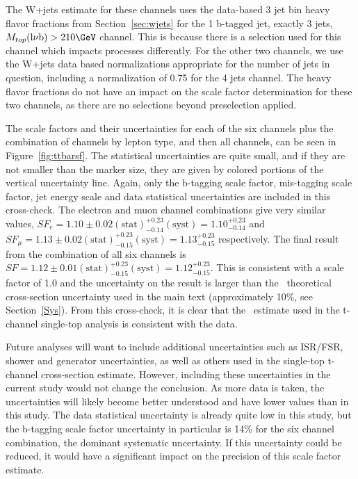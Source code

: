 The W+jets estimate for these channels uses the data-based 3 jet bin heavy flavor fractions from Section~\ref{sec:wjets} for the 1 b-tagged jet, exactly 3  jets, $M_{top}(\rm l\nu b)>210\GeV$ channel.  This is because there is a selection used for this channel which impacts processes differently.  For the other two channels, we use the W+jets data based normalizations appropriate for the number of jets in question, including a normalization of 0.75 for the 4 jets channel.  The heavy flavor fractions do not have an impact on the scale factor determination for these two channels, as there are no selections beyond preselection applied.

The scale factors and their uncertainties for each of the six channels plus the combination of channels by lepton type, and then all channels, can be seen in Figure~\ref{fig:ttbarsf}.  The statistical uncertainties are quite small, and if they are not smaller than the marker size, they are given by colored portions of the vertical uncertainty line.  Again, only the b-tagging scale factor, mis-tagging scale factor, jet energy scale and data statistical uncertainties are included in this cross-check.  The electron and muon channel combinations give very similar values, $SF_{e} = 1.10\pm0.02 \mathrm{(stat)} ^{+0.23}_{-0.14} \mathrm{(syst)} = 1.10^{+0.23}_{-0.14}$ and $SF_{\mu} = 1.13\pm0.02 \mathrm{(stat)} ^{+0.23}_{-0.15} \mathrm{(syst)} = 1.13^{+0.23}_{-0.15}$ respectively.  The final result from the combination of all six channels is $SF = 1.12\pm0.01 \mathrm{(stat)} ^{+0.23}_{-0.15} \mathrm{(syst)} = 1.12^{+0.23}_{-0.15}$.  This is consistent with a scale factor of 1.0 and the uncertainty on the result is larger than the \ttbar~theoretical cross-section uncertainty used in the main text (approximately 10\%, see Section~\ref{Sys}).  From this cross-check, it is clear that the \ttbar~estimate used in the t-channel single-top analysis is consistent with the data.

Future analyses will want to include additional uncertainties such as ISR/FSR, shower and generator uncertainties, as well as others used in the single-top t-channel cross-section estimate.  However, including these uncertainties in the current study would not change the conclusion.  As more data is taken, the uncertainties will likely become better understood and have lower values than in this study.  The data statistical uncertainty is already quite low in this study, but the b-tagging scale factor uncertainty in particular is 14\% for the six channel combination, the dominant systematic uncertainty.  If this uncertainty could be reduced, it would have a significant impact on the precision of this scale factor estimate.

